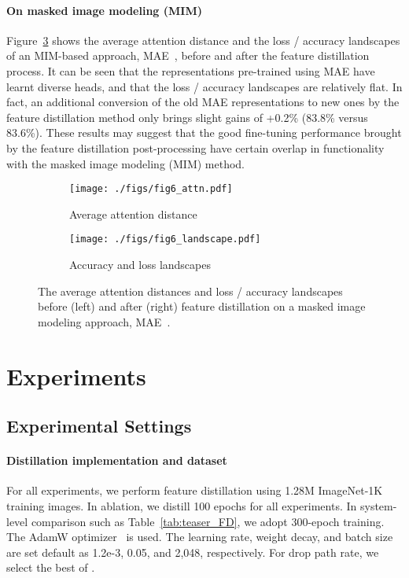 \documentclass{article}
\begin{document}
\paragraph{On masked image modeling (MIM)} Figure~\ref{fig:fd_mae} shows the average attention distance and the loss / accuracy landscapes of an MIM-based approach, MAE~\cite{MaskedAutoencoders2021}, before and after the feature distillation process. It can be seen that the representations pre-trained using MAE have learnt diverse heads, and that the loss / accuracy landscapes are relatively flat. In fact, an additional conversion of the old MAE representations to new ones by the feature distillation method only brings slight gains of +0.2\% (83.8\% versus 83.6\%). These results may suggest that the good fine-tuning performance brought by the feature distillation post-processing have certain overlap in functionality with the masked image modeling (MIM) method.

\begin{figure}
\centering
\begin{subfigure}{.45\textwidth}
  \centering
  \texttt{[image: ./figs/fig6\_attn.pdf]}
  \caption{Average attention distance}
  \label{fig:fd_mae_a}
\end{subfigure}\begin{subfigure}{.55\textwidth}
  \centering
  \texttt{[image: ./figs/fig6\_landscape.pdf]}
  \caption{Accuracy and loss landscapes}
  \label{fig:fd_mae_b}
\end{subfigure}

    \caption{The average attention distances and loss / accuracy landscapes before (left) and after (right) feature distillation on a masked image modeling approach, MAE~\cite{MaskedAutoencoders2021}. }
    \label{fig:fd_mae}
\end{figure}

\section{Experiments}
\label{sec-experiment}
\subsection{Experimental Settings}

\paragraph{Distillation implementation and dataset} For all experiments, we perform feature distillation using 1.28M ImageNet-1K training images. In ablation, we distill 100 epochs for all experiments. In system-level comparison such as Table~\ref{tab:teaser_FD}, we adopt 300-epoch training. The AdamW optimizer~\cite{kingma2014adam} is used. The learning rate, weight decay, and batch size are set default as 1.2e-3, 0.05, and 2,048, respectively. For drop path rate, we select the best of .
\end{document}
